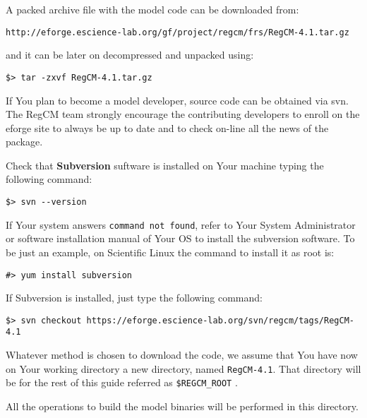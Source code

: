 %
%

A packed archive file with the model code can be downloaded from:

\begin{Verbatim}
http://eforge.escience-lab.org/gf/project/regcm/frs/RegCM-4.1.tar.gz
\end{Verbatim}

and it can be later on decompressed and unpacked using:

\begin{Verbatim}
$> tar -zxvf RegCM-4.1.tar.gz
\end{Verbatim}

If You plan to become a model developer, source code can be obtained via svn.
The RegCM team strongly encourage the contributing developers to enroll on
the eforge site to always be up to date and to check on-line all the news of
the package.

Check that {\bf Subversion} suftware is installed on Your machine typing
the following command:

\begin{verbatim}
$> svn --version
\end{verbatim}

If Your system answers \verb=command not found=, refer to Your System
Administrator or software installation manual of Your OS to install the
subversion software. To be just an example, on Scientific Linux the command
to install it as root is:

\begin{verbatim}
#> yum install subversion
\end{verbatim}

If Subversion is installed, just type the following command:

\begin{verbatim}
$> svn checkout https://eforge.escience-lab.org/svn/regcm/tags/RegCM-4.1
\end{verbatim}

Whatever method is chosen to download the code, we assume that You have now
on Your working directory a new directory, named \verb=RegCM-4.1=.
That directory will be for the rest of this guide referred as 
\verb=$REGCM_ROOT= .

All the operations to build the model binaries will be performed in this
directory.

